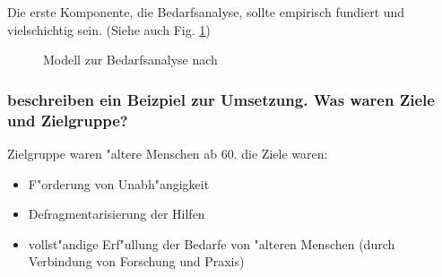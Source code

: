 \noindent Die erste Komponente, die Bedarfsanalyse, sollte empirisch fundiert und vielschichtig sein. (Siehe auch Fig. \ref{fig:finifter1})

\begin{figure}[hb!]
        \begin{center}
        \end{center}
        \caption{Modell zur Bedarfsanalyse nach \textcite{finifter_comprehensive_2005}}
        \label{fig:finifter1}
\end{figure}

\subsubsection{\Textcite{finifter_comprehensive_2005} beschreiben ein Beizpiel zur Umsetzung. Was waren Ziele und Zielgruppe?}
Zielgruppe waren "altere Menschen ab 60. die Ziele waren:
\begin{itemize}
        \item F"orderung von Unabh"angigkeit
        \item Defragmentarisierung der Hilfen
        \item vollst"andige Erf"ullung der Bedarfe von "alteren Menschen (durch Verbindung von Forschung und Praxis)
\end{itemize}

